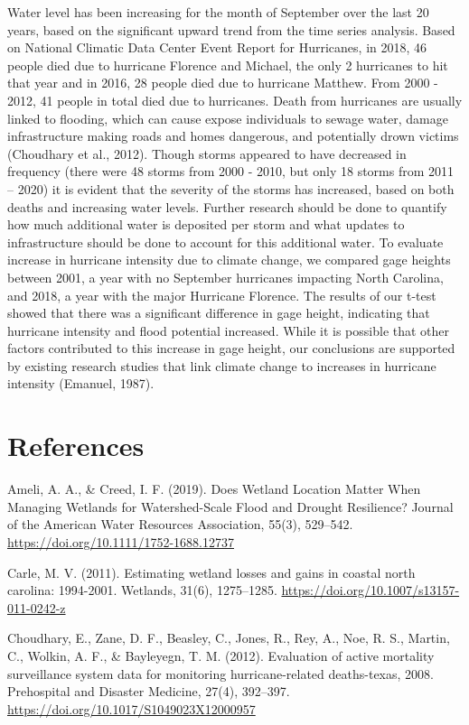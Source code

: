 \documentclass[
  12pt,
]{article}
\begin{document}
Water level has been increasing for the month of September over the last
20 years, based on the significant upward trend from the time series
analysis. Based on National Climatic Data Center Event Report for
Hurricanes, in 2018, 46 people died due to hurricane Florence and
Michael, the only 2 hurricanes to hit that year and in 2016, 28 people
died due to hurricane Matthew. From 2000 - 2012, 41 people in total died
due to hurricanes. Death from hurricanes are usually linked to flooding,
which can cause expose individuals to sewage water, damage
infrastructure making roads and homes dangerous, and potentially drown
victims (Choudhary et al., 2012). Though storms appeared to have
decreased in frequency (there were 48 storms from 2000 - 2010, but only
18 storms from 2011 -- 2020) it is evident that the severity of the
storms has increased, based on both deaths and increasing water levels.
Further research should be done to quantify how much additional water is
deposited per storm and what updates to infrastructure should be done to
account for this additional water. To evaluate increase in hurricane
intensity due to climate change, we compared gage heights between 2001,
a year with no September hurricanes impacting North Carolina, and 2018,
a year with the major Hurricane Florence. The results of our t-test
showed that there was a significant difference in gage height,
indicating that hurricane intensity and flood potential increased. While
it is possible that other factors contributed to this increase in gage
height, our conclusions are supported by existing research studies that
link climate change to increases in hurricane intensity (Emanuel, 1987).

\newpage

\hypertarget{references}{%
\section{References}\label{references}}

Ameli, A. A., \& Creed, I. F. (2019). Does Wetland Location Matter When
Managing Wetlands for Watershed-Scale Flood and Drought Resilience?
Journal of the American Water Resources Association, 55(3), 529--542.
\url{https://doi.org/10.1111/1752-1688.12737}

Carle, M. V. (2011). Estimating wetland losses and gains in coastal
north carolina: 1994-2001. Wetlands, 31(6), 1275--1285.
\url{https://doi.org/10.1007/s13157-011-0242-z}

Choudhary, E., Zane, D. F., Beasley, C., Jones, R., Rey, A., Noe, R. S.,
Martin, C., Wolkin, A. F., \& Bayleyegn, T. M. (2012). Evaluation of
active mortality surveillance system data for monitoring
hurricane-related deaths-texas, 2008. Prehospital and Disaster Medicine,
27(4), 392--397. \url{https://doi.org/10.1017/S1049023X12000957}
\end{document}
